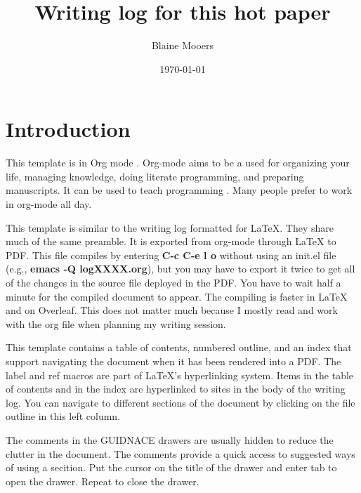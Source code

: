 \documentclass[11pt,letterpaper]{article}
\author{Blaine Mooers}
\date{\today}
\title{Writing log for this hot paper}
\begin{document}
\maketitle
\maketitle


\tableofcontents





\section{Introduction}
\label{sec:org78acf67}

This template is in Org mode \cite{Dominik2016TheOrgMode9ReferenceManualOrganizeYourLifeWithGNUEmacs}.
Org-mode aims to be a used for organizing your life, managing knowledge, doing literate programming, and preparing manuscripts.
It can be used to teach programming \cite{Birkenkrahe2023TeachingDataScienceWithLiterateProgrammingTools}.
Many people prefer to work in org-mode all day.


This template is similar to the writing log formatted for \LaTeX{}.
They share much of the same preamble.
It is exported from org-mode through \LaTeX{} to PDF.
This file compiles by entering \textbf{C-c C-e l o} without using an init.el file (e.g., \textbf{emacs -Q logXXXX.org}), but you may have to export it twice to get all of the changes in the source file deployed in the PDF.
You have to wait half a minute for the compiled document to appear.
The compiling is faster in \LaTeX{} and on Overleaf.
This does not matter much because I mostly read and work with the org file when planning my writing session.

This template contains a table of contents, numbered outline, and an index that support navigating the document when it has been rendered into a PDF.
The label and ref macros are part of LaTeX's hyperlinking system.
Items in the table of contents and in the index are hyperlinked to sites in the body of the writing log.
You can navigate to different sections of the document by clicking on the file outline in this left column.

The comments in the GUIDNACE drawers are usually hidden to reduce the clutter in the document.
The comments  provide a quick access to suggested ways of using a secition.
Put the cursor on the title of the drawer and enter tab to open the drawer.
Repeat to close the drawer.
\end{document}
